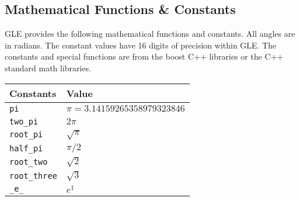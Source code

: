 \subsection{Mathematical Functions \& Constants}

GLE provides the following mathematical functions and constants.  All angles are in radians. The constant values have 16 digits of precision within GLE.  The constants and special functions are from the boost C++ libraries or the C++ standard math libraries.

\begin{supertabular}{ll} \hline
Constants & Value  \\ \hline
{\tt pi}       & $\pi = 3.14159265358979323846 $ \\
{\tt two\_pi}   & $2\pi $ \\
{\tt root\_pi}  & $\sqrt{\pi}$ \\
{\tt half\_pi}   & $\pi/2$ \\
{\tt root\_two}   & $\sqrt{2}$ \\
{\tt root\_three}   & $\sqrt{3}$ \\
{\tt \_e\_}      & $e^1$ \\
\end{supertabular}




